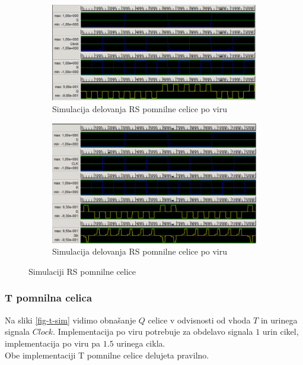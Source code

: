 \documentclass[a4paper, 11pt]{article}
\begin{document}
\begin{figure}[h!]
	\begin{subfigure}[b]{\textwidth}
	\includegraphics[width=\textwidth]{../img/vir_4/sim_sr.png}
	\caption{Simulacija delovanja RS pomnilne celice po viru \cite{quantum_dot}}
	\label{fig-rs-1-sim}
	\end{subfigure}
	\begin{subfigure}[b]{\textwidth}
	\includegraphics[width=\textwidth]{../img/vir_5/sim_rs.png}
	\caption{Simulacija delovanja RS pomnilne celice po viru \cite{a_novel_approach}}
	\label{fig-rs-2-sim}
	\end{subfigure}
	\caption{Simulaciji RS pomnilne celice}
	\label{fig-rs-sim}
\end{figure}

\subsubsection{T pomnilna celica}
Na sliki \ref{fig-t-sim} vidimo obnašanje $Q$ celice v odvisnosti od vhoda $T$ in urinega signala $Clock$.
Implementacija po viru \cite{quantum_dot} potrebuje za obdelavo signala $1$ urin cikel, implementacija po viru \cite{a_novel_approach} pa $1.5$ urinega cikla.\\
Obe implementaciji T pomnilne celice delujeta pravilno.
\end{document}
